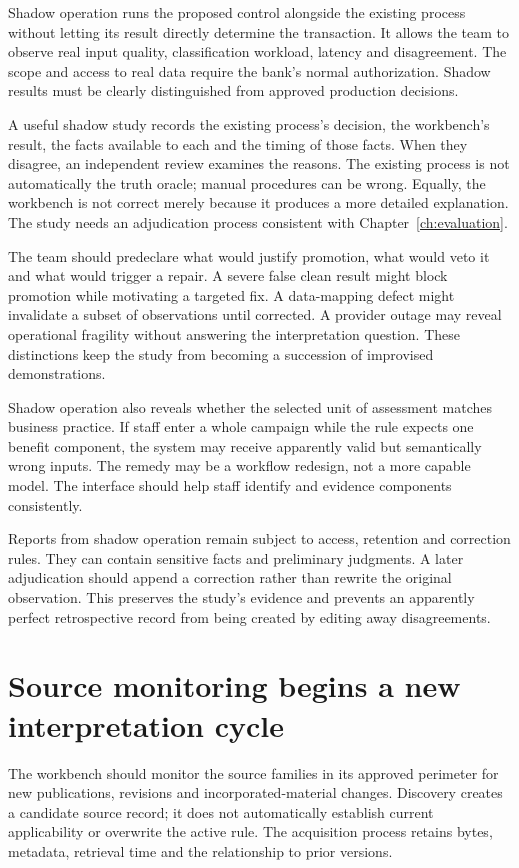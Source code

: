 \documentclass[12pt,a4paper,oneside,openany]{book}
\begin{document}
Shadow operation runs the proposed control alongside the existing process without
letting its result directly determine the transaction. It allows the team to
observe real input quality, classification workload, latency and disagreement.
The scope and access to real data require the bank's normal authorization.
Shadow results must be clearly distinguished from approved production decisions.

A useful shadow study records the existing process's decision, the workbench's
result, the facts available to each and the timing of those facts. When they
disagree, an independent review examines the reasons. The existing process is not
automatically the truth oracle; manual procedures can be wrong. Equally, the
workbench is not correct merely because it produces a more detailed explanation.
The study needs an adjudication process consistent with Chapter~\ref{ch:evaluation}.

The team should predeclare what would justify promotion, what would veto it and
what would trigger a repair. A severe false clean result might block promotion
while motivating a targeted fix. A data-mapping defect might invalidate a subset
of observations until corrected. A provider outage may reveal operational
fragility without answering the interpretation question. These distinctions keep
the study from becoming a succession of improvised demonstrations.

Shadow operation also reveals whether the selected unit of assessment matches
business practice. If staff enter a whole campaign while the rule expects one
benefit component, the system may receive apparently valid but semantically wrong
inputs. The remedy may be a workflow redesign, not a more capable model. The
interface should help staff identify and evidence components consistently.

Reports from shadow operation remain subject to access, retention and correction
rules. They can contain sensitive facts and preliminary judgments. A later
adjudication should append a correction rather than rewrite the original
observation. This preserves the study's evidence and prevents an apparently
perfect retrospective record from being created by editing away disagreements.

\section{Source monitoring begins a new interpretation cycle}

The workbench should monitor the source families in its approved perimeter for
new publications, revisions and incorporated-material changes. Discovery creates
a candidate source record; it does not automatically establish current
applicability or overwrite the active rule. The acquisition process retains bytes,
metadata, retrieval time and the relationship to prior versions.
\end{document}
